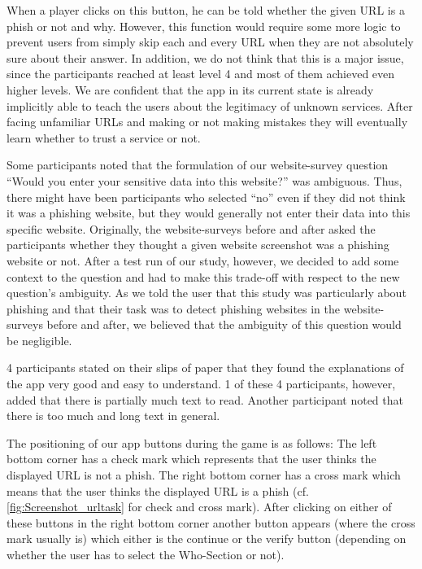 \begin{description}[leftmargin=0cm]
When a player clicks on this button, he can be told whether the given URL is a phish or not and why.
However, this function would require some more logic to prevent users from simply skip each and every URL when they are not absolutely sure about their answer.
In addition, we do not think that this is a major issue, since the participants reached at least level 4 and most of them achieved even higher levels.
We are confident that the app in its current state is already implicitly able to teach the users about the legitimacy of unknown services.
After facing unfamiliar URLs and making or not making mistakes they will eventually learn whether to trust a service or not.
	\item[Question to Data Entry:] Some participants noted that the formulation of our website-survey question ``Would you enter your sensitive data into this website?'' was ambiguous.
Thus, there might have been participants who selected ``no'' even if they did not think it was a phishing website, but they would generally not enter their data into this specific website.
Originally, the website-surveys before and after asked the participants whether they thought a given website screenshot was a phishing website or not.
After a test run of our study, however, we decided to add some context to the question and had to make this trade-off with respect to the new question's ambiguity.
As we told the user that this study was particularly about phishing and that their task was to detect phishing websites in the website-surveys before and after, we believed that the ambiguity of this question would be negligible.
	\item[Explanations and Comprehensibility:]
4 participants stated on their slips of paper that they found the explanations of the app very good and easy to understand.
1 of these 4 participants, however, added that there is partially much text to read.
Another participant noted that there is too much and long text in general.
	\item[Button Positioning:] The positioning of our app buttons during the game is as follows: 
The left bottom corner has a check mark which represents that the user thinks the displayed URL is not a phish.
The right bottom corner has a cross mark which means that the user thinks the displayed URL is a phish (cf. \autoref{fig:Screenshot_urltask} for check and cross mark).
After clicking on either of these buttons in the right bottom corner another button appears (where the cross mark usually is) which either is the continue or the verify button (depending on whether the user has to select the Who-Section or not).

\end{description}
